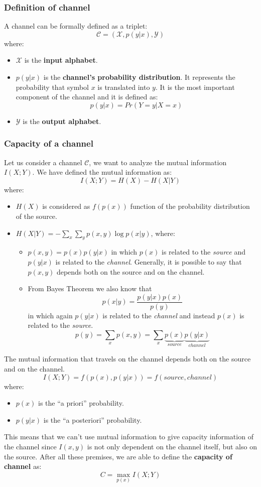 \subsubsection{Definition of channel}
A channel can be formally defined as a triplet:
$$\mathcal{C} = (\mathcal{X}, p(y|x), \mathcal{Y})$$
where:
\begin{itemize}
	\item $\mathcal{X}$ is the \textbf{input alphabet}.
	\item $p(y|x)$ is the \textbf{channel's probability distribution}. It represents the probability that symbol $x$ is translated into $y$. It is the most important component of the channel and it is defined as:
	$$p(y|x) = Pr(Y=y | X = x)$$
	\item $\mathcal{Y}$ is the \textbf{output alphabet}.
\end{itemize}

\subsubsection{Capacity of a channel}
Let us consider a channel $\mathcal{C}$, we want to analyze the mutual information $I(X;Y)$. We have defined the mutual information as:
$$I(X;Y) = H(X) - H(X|Y)$$
where:
\begin{itemize}
	\item $H(X)$ is considered as $f(p(x))$ function of the probability distribution of the source.
	\item $H(X|Y) = -\sum_x \sum_y p(x,y) \log{p(x|y)}$, where:
		\begin{itemize}
			\item $p(x,y) = p(x)p(y|x)$ in which $p(x)$ is related to the \textit{source} and $p(y|x)$ is related to the \textit{channel}. Generally, it is possible to say that $p(x,y)$ depends both on the source and on the channel.
			\item From Bayes Theorem we also know that $$p(x|y) = \frac{p(y|x) p(x)}{p(y)}$$ in which again $p(y|x)$ is related to the \textit{channel} and instead $p(x)$ is related to the \textit{source}.
			$$p(y) = \sum_x p(x,y) = \sum_x \underbrace{p(x)}_{source}\underbrace{p(y|x)}_{channel}$$
		\end{itemize} 
\end{itemize}
The mutual information that travels on the channel depends both on the source and on the channel.
$$I(X;Y) = f(p(x), p(y|x)) = f(source, channel)$$
where:
\begin{itemize}
	\item $p(x)$ is the ``a priori''  probability.
	\item $p(y|x)$ is the ``a posteriori'' probability.
\end{itemize}
This means that we can't use mutual information to give capacity information of the channel since $I(x,y)$ is not only dependent on the channel itself, but also on the source.	
After all these premises, we are able to define the \textbf{capacity of channel} as:
$$C = \max_{p(x)} I(X;Y)$$

